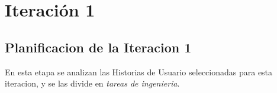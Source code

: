 \section{Iteración 1}
\label{sec:iteracion_1}


%

\subsection{Planificacion de la Iteracion 1}

En esta etapa se analizan las Historias de Usuario seleccionadas para esta iteracion, y se las divide en \emph{tareas de ingenieria}. \\



%
%

